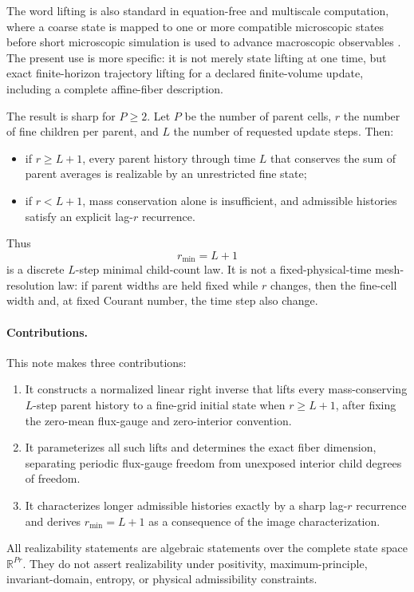 \documentclass[11pt]{article}
\newcommand{\R}{\mathbb R}
\begin{document}
The word lifting is also standard in equation-free and multiscale
computation, where a coarse state is mapped to one or more compatible
microscopic states before short microscopic simulation is used to advance
macroscopic observables \cite{Kevrekidis2003}.  The present use is more
specific: it is not merely state lifting at one time, but exact
finite-horizon trajectory lifting for a declared finite-volume update,
including a complete affine-fiber description.

The result is sharp for \(P\ge2\).  Let \(P\) be the number of parent cells,
\(r\) the number of fine children per parent, and \(L\) the number of
requested update steps.  Then:
\begin{itemize}
\item if \(r\ge L+1\), every parent history through time \(L\) that
conserves the sum of parent averages is realizable by an unrestricted fine
state;
\item if \(r<L+1\), mass conservation alone is insufficient, and admissible
histories satisfy an explicit lag-\(r\) recurrence.
\end{itemize}
Thus
\[
  r_{\min}=L+1
\]
is a discrete \(L\)-step minimal child-count law.  It is not a
fixed-physical-time mesh-resolution law: if parent widths are held fixed
while \(r\) changes, then the fine-cell width and, at fixed Courant number,
the time step also change.

\paragraph{Contributions.}
This note makes three contributions:
\begin{enumerate}
\item It constructs a normalized linear right inverse that lifts every
mass-conserving \(L\)-step parent history to a fine-grid initial state when
\(r\ge L+1\), after fixing the zero-mean flux-gauge and zero-interior
convention.
\item It parameterizes all such lifts and determines the exact fiber
dimension, separating periodic flux-gauge freedom from unexposed interior
child degrees of freedom.
\item It characterizes longer admissible histories exactly by a sharp
lag-\(r\) recurrence and derives \(r_{\min}=L+1\) as a consequence of the
image characterization.
\end{enumerate}

All realizability statements are algebraic statements over the complete
state space \(\R^{Pr}\).  They do not assert realizability under positivity,
maximum-principle, invariant-domain, entropy, or physical admissibility
constraints.
\end{document}
